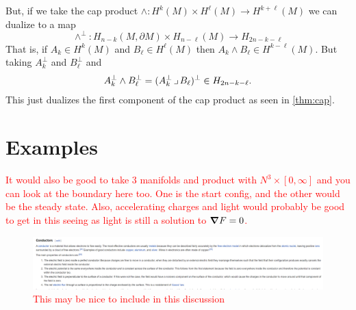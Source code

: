 \documentclass{article}
\begin{document}
But, if we take the cap product $\wedge \colon H^k(M) \times H^\ell(M) \to H^{k+\ell}(M)$ we can dualize to a map
\begin{equation}
    \wedge^\perp \colon H_{n-k}(M,\partial M) \times H_{n-\ell}(M) \to H_{2n-k-\ell}
\end{equation}
That is, if $A_k \in H^k(M)$ and $B_\ell \in H^\ell(M)$ then $A_k \wedge B_\ell \in H^{k-\ell}(M)$. But taking $A_k^\perp$ and $B_\ell^\perp$ and
\begin{align}
    A_k^\perp \wedge B_\ell^\perp = (A_k^\perp \hspace*{.5mm}\lrcorner \hspace*{.5mm} B_\ell)^\perp \in H_{2n-k-\ell}.
\end{align}
This just dualizes the first component of the cap product as seen in \cref{thm:cap}.


\section{Examples}

\textcolor{red}{It would also be good to take 3 manifolds and product with $N^3 \times [0,\infty]$ and you can look at the boundary here too. One is the start config, and the other would be the steady state. Also, accelerating charges and light would probably be good to get in this seeing as light is still a solution to $\boldsymbol{\nabla} F=0$.}

\begin{figure}[H]
    \centering
    \includegraphics[width=\textwidth]{figures/conductors.png}
    \caption{\textcolor{red}{This may be nice to include in this discussion}}
\end{figure}

\end{document}
